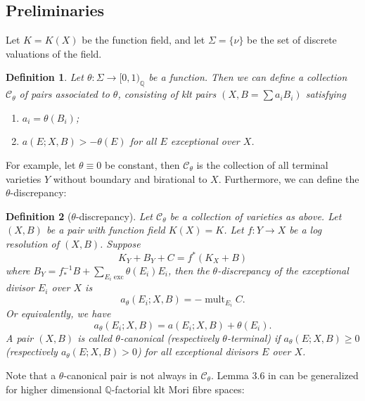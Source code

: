 \documentclass[11pt]{amsart}
\newtheorem{defn}{Definition}[section]
\begin{document}
\subsection{Preliminaries}
Let $ K=K(X) $ be the function field, and let $ \Sigma=\{\nu\} $ be the set of discrete valuations of the field.
\begin{defn}\label{thetacategory}
  \cite[Definition 3.5]{brunoLogSarkisovProgram1995}
  Let  $\theta:\Sigma\to [0,1)_\mathbb{Q}$ be a function. Then we can define a collection $ \mathcal{C}_\theta $ of pairs  associated to $ \theta $, consisting of klt pairs $ (X,B=\sum a_iB_i) $ satisfying
  \begin{enumerate}
    \item $ a_i=\theta(B_i) $;
    \item $ a(E;X,B)>-\theta(E) $ for all $ E $ exceptional over $ X $.
  \end{enumerate}
\end{defn}
For example, let $\theta \equiv 0$ be constant, then $\mathcal{C}_{\theta}$ is the collection of all terminal varieties $Y$ without boundary and birational to $X$. Furthermore, we can define the $\theta$-discrepancy:
\begin{defn}[$\theta$-discrepancy]
  Let $\mathcal{C}_{\theta}$ be a collection of varieties as above. Let $(X, B)$ be a pair with function field $K(X)=K$. Let  $f: Y\to X$ be a log resolution of $(X, B)$. Suppose
  \[
    K_{Y}+B_{Y}+C=f^*(K_{X}+B)
  \]
  where $B_{Y}=f^{-1}_*B+ \sum_{E_{i}\text{ exc}} \theta(E_{i})E_{i}$, then the $\theta$-discrepancy  of the exceptional divisor $E_{i}$ over $X$ is
  \[
    a_{\theta}(E_{i};X,B)=-\operatorname{mult}_{E_{i}}C.
  \]
  Or equivalently, we have
  \[
    a_{\theta}(E_{i};X,B)=a(E_{i};X,B)+\theta(E_{i}).
  \]
  A pair $(X,B)$ is called $\theta$-canonical (respectively $\theta$-terminal) if $a_{\theta}(E;X,B)\geqslant 0$ (respectively $a_{\theta}(E;X,B)> 0$) for all exceptional  divisors $E$ over $X$.
\end{defn}
Note that a $\theta$-canonical pair is not always in $\mathcal{C}_{\theta}$.
Lemma 3.6 in \cite{brunoLogSarkisovProgram1995} can be generalized for higher dimensional $\mathbb{Q}$-factorial klt Mori fibre spaces:
\end{document}
